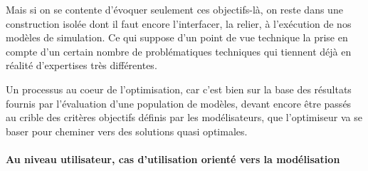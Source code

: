 Mais si on se contente d'évoquer seulement ces objectifs-là, on reste dans une construction isolée dont il faut encore l'interfacer, la relier, à l'exécution de nos modèles de simulation. Ce qui suppose d'un point de vue technique la prise en compte d'un certain nombre de problématiques techniques qui tiennent déjà en réalité d'expertises très différentes.  

Un processus au coeur de l'optimisation, car c'est bien sur la base des résultats fournis par l'évaluation d'une population de modèles, devant encore être passés au crible des critères objectifs définis par les modélisateurs, que l'optimiseur va se baser pour cheminer vers des solutions quasi optimales.

\paragraph{Au niveau utilisateur, cas d'utilisation orienté vers la modélisation }

